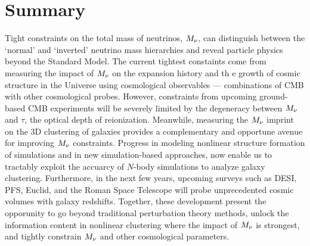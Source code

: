 \section{Summary} \label{sec:summary} 
Tight constraints on the total mass of neutrinos, $M_\nu$, can distinguish
between the `normal' and `inverted' neutrino mass hierarchies and reveal
particle physics beyond the Standard Model. The current tightest constaints 
come from measuring the impact of $M_\nu$ on the expansion history and th
e growth of cosmic structure in the Universe using cosmological observables --- 
combinations of CMB with other cosmological probes. However, constraints from 
upcoming ground-based CMB experiments will be severely limited by the degeneracy
between $M_\nu$ and $\tau$, the optical depth of reionization. Meanwhile, 
measuring the $M_\nu$ imprint on the 3D clustering of galaxies provides a 
complementary and opportune avenue for improving $M_\nu$ constraints. Progress
in modeling nonlinear structure formation of simulations and in new
simulation-based approaches, now enable us to tractably exploit the accuarcy of
$N$-body simulations to analyze galaxy clustering. Furthermore, in the next few
years, upcoming surveys such as DESI, PFS, Euclid, and the Roman Space Telescope
will probe unprecedented cosmic volumes with galaxy redshifts. Together, these 
development present the opporunity to go beyond traditional perturbation theory methods, unlock the
information content in nonlinear clustering where the impact of $M_\nu$ is
strongest, and tightly constrain $M_\nu$ and other cosmological parameters. 


